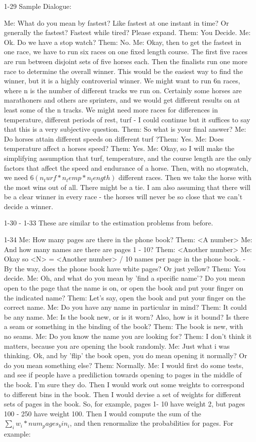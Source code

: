 1-29
Sample Dialogue:

Me: What do you mean by fastest? Like fastest at one instant in time? Or generally the fastest? Fastest while tired? Please expand.
Them: You Decide. 
Me: Ok. Do we have a stop watch?
Them: No.
Me: Okay, then to get the fastest in one race, we have to run six races on one fixed length course. The first five races are run between disjoint sets of five horses each. Then the finalists run one more race to determine the overall winner. 
This would be the easiest way to find the winner, but it is a highly controverial winner. We might want to run 6n races, where n is the number of different tracks we run on. Certainly some horses are marathoners and others are sprinters, and we would get different results on at least some of the n tracks. We might need more races for differences in temperature, different periods of rest, turf - I could continue but it suffices to say that this is a very subjective question. 
Them: So what is your final answer?
Me: Do horses attain different speeds on different turf
?Them: Yes.
Me: Does temperature affect a horses speed? 
Them: Yes.
Me: Okay, so I will make the simplifying assumption that turf, temperature, and the course length are the only factors that affect the speed and endurance of a horse. Then, with no stopwatch, we need $6(n_turf*n_temp*n_length)$ different races. Then we take the horse with the most wins out of all. There might be a tie. I am also assuming that there will be a clear winner in every race - the horses will never be so close that we can't decide a winner.

1-30 - 1-33
These are similar to the estimation problems from before. 

1-34
Me: How many pages are there in the phone book?
Them: <A number>
Me: And how many names are there are pages 1 - 10?
Them: <Another number> 
Me: Okay so <N> = <Another number> / 10 names per page in the phone book. - By the way, does the phone book have white pages? Or just yellow?
Them: You decide.
Me: Oh, and what do you mean by 'find a specific name'? Do you mean open to the page that the name is on, or open the book and put your finger on the indicated name?
Them: Let's say, open the book and put your finger on the correct name.
Me: Do you have any name in particular in mind?
Them: It could be any name.
Me: Is the book new, or is it worn? Also, how is it bound? Is there a seam or something in the binding of the book?
Them: The book is new, with no seams.
Me: Do you know the name you are looking for?
Them: I don't think it matters, because you are opening the book randomly.
Me: Just what i was thinking. Ok, and by 'flip' the book open, you do mean opening it normally? Or do you mean something else?
Them: Normally.
Me: I would first do some tests, and see if people have a prediliction towards opening to pages in the middle of the book. I'm sure they do. Then I would work out some weights to correspond to different bins in the book. Then I would devise a set of weights for different sets of pages in the book. So, for example, pages 1- 10 have weight 2, but pages 100 - 250 have weight 100. Then I would compute the sum of the $\sum_i w_i * num_pages_bin_i$, and then renormalize the probabilities for pages. For example:

